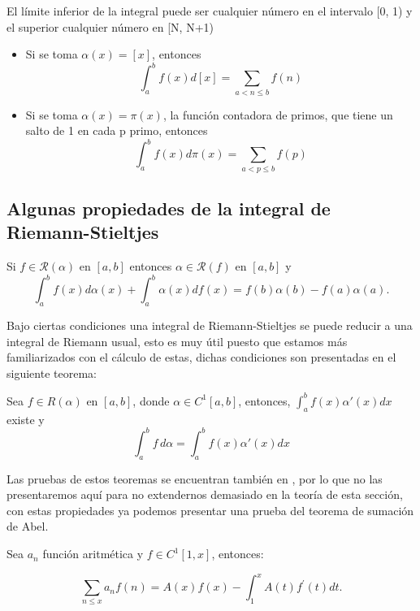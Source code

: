 \begin{note}
El límite inferior de la integral puede ser cualquier número en el intervalo [0, 1) y el superior cualquier número en [N, N+1)
\end{note}

\begin{eg}
\phantom{uwu}
\begin{itemize}
\item Si se toma $\alpha(x)=[x]$, entonces
$$
\int_a^b f(x) d[x]=\sum_{a<n \leq b} f(n)
$$

\item Si se toma $\alpha(x)=\pi(x)$, la función contadora de primos, que tiene un salto de 1 en cada p primo, entonces
$$
\int_a^b f(x) d \pi(x)=\sum_{a<p \leq b} f(p)
$$
\end{itemize}
\end{eg}

\subsection{Algunas propiedades de la integral de Riemann-Stieltjes}


\begin{theorem}
    Si $f\in \mathcal{R}(\alpha)$ en $[a,b]$ entonces $\alpha \in\mathcal{R}(f)$ en $[a,b]$ y $$\int_{a}^{b}f(x)d\alpha(x)+\int_{a}^{b}\alpha(x)df(x)=f(b)\alpha(b)-f(a)\alpha(a).$$
\end{theorem}

Bajo ciertas condiciones una integral de Riemann-Stieltjes se puede reducir a una integral de Riemann usual, esto es muy útil puesto que estamos más familiarizados con el cálculo de estas, dichas condiciones son presentadas en el siguiente teorema:

\begin{theorem}\label{reduccion a riemann}
    Sea $ f \in R(\alpha) $ en $[a, b]$, donde $ \alpha \in C^1[a, b]$, entonces,
$ \displaystyle\int_{a}^{b} f(x)\alpha'(x)dx$
existe y\[ \int_{a}^{b} f \,d\alpha = \int_{a}^{b} f(x)\alpha'(x)dx \]
\end{theorem}

Las pruebas de estos teoremas se encuentran también en \cite{Apostol:105425}, por lo que no las presentaremos aquí para no extendernos demasiado en la teoría de esta sección, con estas propiedades ya podemos presentar una prueba  del teorema de  sumación de Abel.

\begin{theorem}\label{Teorema sumacion de Abel}
Sea $a_n$ función aritmética y $f\in C^1[1,x]$, entonces:

$$
\sum_{n \leq x} a_n f(n)=A(x) f(x)-\int_1^x A(t) f^{\prime}(t) d t .
$$
\end{theorem}

